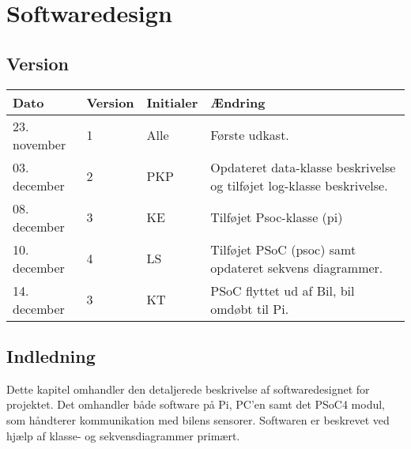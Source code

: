 \chapter{Softwaredesign} \label{ch:softwaredesign}

\section*{Version}
\begin{table}[h]
	\centering
	\begin{tabularx}{\textwidth - 2cm}{|l|l|l|X|}
	\hline
	Dato			& Version		& Initialer 	& Ændring																	\\ \hline
	23. november	& 1 			& Alle			& Første udkast. 															\\ \hline
	03. december 	& 2 			& PKP			& Opdateret data-klasse beskrivelse og tilføjet log-klasse beskrivelse. 	\\ \hline
	08. december 	& 3 			& KE			& Tilføjet Psoc-klasse (pi) 											\\ \hline
	10. december 	& 4 			& LS			& Tilføjet PSoC (psoc) samt opdateret sekvens diagrammer.					\\ \hline
	14. december	& 3 			& KT		 	& PSoC flyttet ud af Bil, bil omdøbt til Pi.	\\\hline
\end{tabularx}
\end{table}

\section*{Indledning}

Dette kapitel omhandler den detaljerede beskrivelse af softwaredesignet for projektet.
Det omhandler både software på Pi, PC'en samt det PSoC4 modul, som håndterer \IIC kommunikation med bilens sensorer.
Softwaren er beskrevet ved hjælp af klasse- og sekvensdiagrammer primært.

\clearpage


\clearpage

\clearpage

\clearpage

